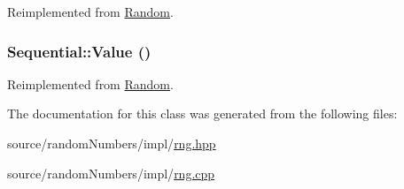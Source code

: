 Reimplemented from \hyperlink{classRandom_22b2951acd2008e8ff58fae434ab7ac5}{Random}.\hypertarget{classSequential_d3a1aca0362e90ff3e8f8fc9c96152d8}{
\subsubsection[{Value}]{ Sequential::Value ()}}
\label{classSequential_d3a1aca0362e90ff3e8f8fc9c96152d8}




Reimplemented from \hyperlink{classRandom_4d1c2876c5c78104186e241209d0e11e}{Random}.

The documentation for this class was generated from the following files:\begin{CompactItemize}
\item 
source/randomNumbers/impl/\hyperlink{rng_8hpp}{rng.hpp}\item 
source/randomNumbers/impl/\hyperlink{rng_8cpp}{rng.cpp}\end{CompactItemize}
